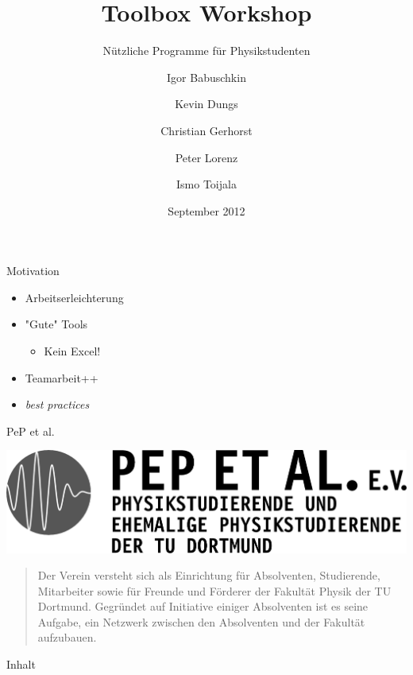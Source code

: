 \documentclass[t]{beamer}
\title{Toolbox Workshop}
\subtitle{Nützliche Programme für Physikstudenten}
\author[Igor B.\and Kevin D.\and Christian G.\and Peter L.\and Ismo T.]{
       Igor Babuschkin%
  \and Kevin Dungs%
  \and Christian Gerhorst%
  \and Peter Lorenz%
  \and Ismo Toijala%
}
\institute[PeP et al. e.V.]{PeP et al. e.V.\thanks{\href{http://pep-dortmund.org}{pep-dortmund.org}}}
\date{September 2012}
\begin{document}
  {
    \begin{frame}
      \titlepage
    \end{frame}
  }

  \begin{frame}{Motivation}
    \begin{itemize}
      \item Arbeitserleichterung
      \item "Gute" Tools \begin{itemize}
        \item Kein Excel!
      \end{itemize}
    \item Teamarbeit++
    \item \textit{best practices}
    \end{itemize}  
  \end{frame}

  \begin{frame}{PeP et al.}
    \begin{center}
      \includegraphics[width=.5\paperwidth]{peplogox.png} 
    \end{center}
    \begin{quote}
      \begin{spacing}{1.0}
        Der Verein versteht sich als Einrichtung für Absolventen, Studierende, Mitarbeiter sowie für Freunde und Förderer der Fakultät Physik der TU Dortmund. Gegründet auf Initiative einiger Absolventen ist es seine Aufgabe, ein Netzwerk zwischen den Absolventen und der Fakultät aufzubauen.
      \end{spacing}
    \end{quote}
  \end{frame}
  

  \begin{frame}{Inhalt}
    \tableofcontents[subsectionstyle=hide]
  \end{frame}

  
  
  
\end{document}
